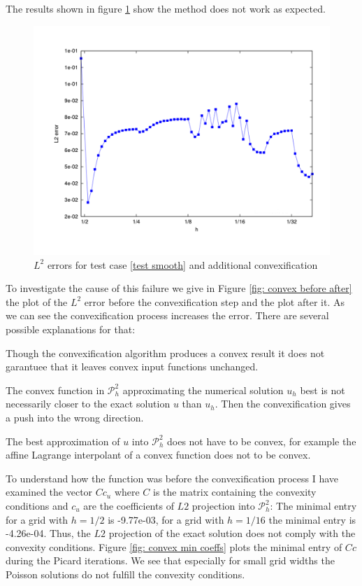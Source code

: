 The results shown in figure \ref{fig: l2 errors test smooth ourMethodConvex} show the method does not work as expected.
\begin{figure}[H]
\centering
	\includegraphics[scale =0.4]{plots/MA1_convexify.pdf}
	\caption{$L^2$ errors for test case \ref{test smooth} and additional convexification}
	\label{fig: l2 errors test smooth ourMethodConvex}
\end{figure}
To investigate the cause of this failure we give in Figure \ref{fig: convex before after} the plot of the $L^2$ error before the convexification step and the plot after it. As we can see the convexification process increases the error. There are several possible explanations for that:

Though the convexification algorithm produces a convex result it does not garantuee that it leaves convex input functions unchanged.

The convex function in $\mathcal P^2_h$ approximating the numerical solution $u_h$ best is not necessarily closer to the exact solution $u$ than $u_h$. Then the convexification gives a push into the wrong direction.

The best approximation of $u$ into $\mathcal P^2_h$ does not have to be convex, for example the affine Lagrange interpolant of a convex function does not to be convex\cite[p.3142]{AM2009}. 

To understand how  the function was before the convexification process I have examined the vector $Cc_u$ where $C$ is the matrix containing the convexity conditions and $c_u$ are the coefficients of $L2$ projection into $\mathcal P^2_h$: The minimal entry for a grid with $h=1/2$ is -9.77e-03, for a grid with $h=1/16$ the minimal entry is -4.26e-04. Thus, the $L2$ projection of the exact solution does not comply with the convexity conditions.
Figure \ref{fig: convex min coeffs} plots the minimal entry of $Cc$ during the Picard iterations. We see that especially for small grid widths the Poisson solutions do not fulfill the convexity conditions. 

